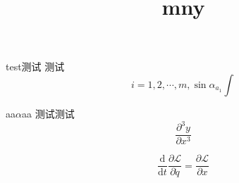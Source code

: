 \documentclass{ctexart}
\title{mny}
\author{}
\begin{document}
\maketitle
test测试
测试
\begin{equation}
    i=1,2,\cdots,m
    , \sin\alpha _{a_1}  \int
\end{equation}

aa$\alpha$aa
测试测试
\begin{equation}
    \frac{\partial^3 y}{\partial x^3}
\end{equation}

\begin{equation}
   \frac{\mathrm{d}}{\mathrm{d} t}\frac{\partial \mathcal{L}}{\partial \dot{q}} 
   = \frac{\partial \mathcal{L}}{\partial x} 
\end{equation}
\end{document}
